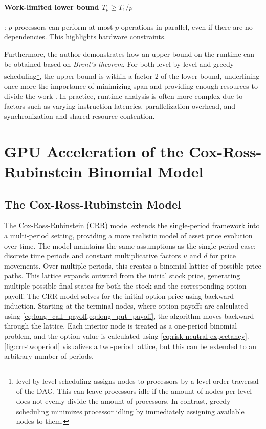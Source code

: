 \documentclass[english,12pt,a4paper,pdftex,sci,utf8]{aaltothesis}
\begin{document}
\paragraph{Work-limited lower bound $T_p \geq T_1/p$}: $p$ processors can perform at most $p$ operations in parallel, even if there are no dependencies. This highlights hardware constraints.

Furthermore, the author demonstrates how an upper bound on the runtime can be obtained based on \emph{Brent's theorem}. For both level-by-level and greedy scheduling\footnote{level-by-level scheduling assigns nodes to processors by a level-order traversal of the DAG. This can leave processors idle if the amount of nodes per level does not evenly divide the amount of processors. In contrast, greedy scheduling minimizes processor idling by immediately assigning available nodes to them.}, the upper bound is within a factor 2 of the lower bound, underlining once more the importance of minimizing span and providing enough resources to divide the work \cite{acar2016parallel}. In practice, runtime analysis is often more complex due to factors such as varying instruction latencies, parallelization overhead, and synchronization and shared resource contention.


\clearpage

\section{GPU Acceleration of the Cox-Ross-Rubinstein Binomial Model} \label{sec:gpu-crr}

\subsection{The Cox-Ross-Rubinstein Model}

The Cox-Ross-Rubinstein (CRR) model extends the single-period framework into a multi-period setting, providing a more realistic model of asset price evolution over time. The model maintains the same assumptions as the single-period case: discrete time periods and constant multiplicative factors $u$ and $d$ for price movements. Over multiple periods, this creates a binomial lattice of possible price paths. This lattice expands outward from the initial stock price, generating multiple possible final states for both the stock and the corresponding option payoff. The CRR model solves for the initial option price using backward induction. Starting at the terminal nodes, where option payoffs are calculated using \cref{eq:long_call_payoff,eq:long_put_payoff}, the algorithm moves backward through the lattice. Each interior node is treated as a one-period binomial problem, and the option value is calculated using \cref{eq:risk-neutral-expectancy}. \cref{fig:crr-twoperiod} visualizes a two-period lattice, but this can be extended to an arbitrary number of periods. \cite{cox1979option}
\end{document}
